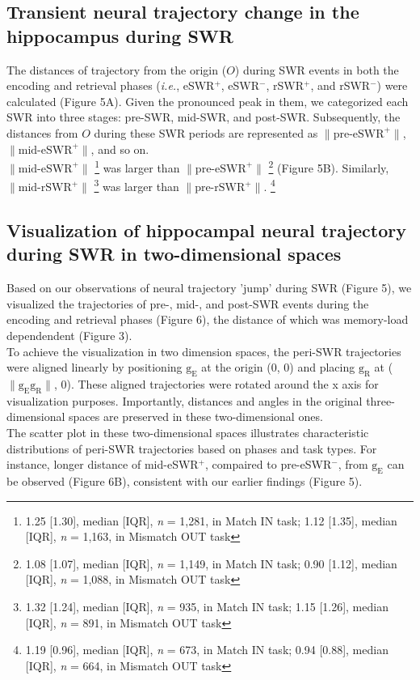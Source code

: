 \documentclass[final,3p,times,twocolumn]{elsarticle}
\begin{document}
\subsection{Transient neural trajectory change in the hippocampus during SWR}
The distances of trajectory from the origin ($O$) during SWR events in both the encoding and retrieval phases (\textit{\textit{i.e.}}, eSWR$^+$, eSWR$^-$, rSWR$^+$, and rSWR$^-$) were calculated (Figure 5A). Given the pronounced peak in them, we categorized each SWR into three stages: pre-SWR, mid-SWR, and post-SWR. Subsequently, the distances from $O$ during these SWR periods are represented as $\mathrm{\lVert \text{pre-eSWR}^+ \rVert}$, $\mathrm{\lVert \text{mid-eSWR}^+ \rVert}$, and so on.
\\
\indent
$\mathrm{\lVert \text{mid-eSWR}^+ \rVert}$
\footnote{1.25 [1.30], median [IQR], \textit{n} = 1,281, in Match IN task; 1.12 [1.35], median [IQR], \textit{n} = 1,163, in Mismatch OUT task}
was larger than $\mathrm{\lVert \text{pre-eSWR}^+ \rVert}$
\footnote{1.08 [1.07], median [IQR], \textit{n} = 1,149, in Match IN task; 0.90 [1.12], median [IQR], \textit{n} = 1,088, in Mismatch OUT task}
(Figure 5B). Similarly, $\mathrm{\lVert \text{mid-rSWR}^+ \rVert}$
\footnote{1.32 [1.24], median [IQR], \textit{n} = 935, in Match IN task; 1.15 [1.26], median [IQR], \textit{n} = 891, in Mismatch OUT task}
was larger than $\mathrm{\lVert \text{pre-rSWR}^+ \rVert}$.
\footnote{1.19 [0.96], median [IQR], \textit{n} = 673, in Match IN task; 0.94 [0.88], median [IQR], \textit{n} = 664, in Mismatch OUT task}

\subsection{Visualization of hippocampal neural trajectory during SWR in two-dimensional spaces}
Based on our observations of neural trajectory 'jump' during SWR (Figure 5), we visualized the trajectories of pre-, mid-, and post-SWR events during the encoding and retrieval phases (Figure 6), the distance of which was memory-load dependendent (Figure 3).
\\
\indent
To achieve the visualization in two dimension spaces, the peri-SWR trajectories were aligned linearly by positioning $\mathrm{g_{E}}$ at the origin (0, 0) and placing $\mathrm{g_{R}}$ at ($\mathrm{\lVert g_{E}g_{R} \rVert}$, 0). These aligned trajectories were rotated around the x axis for visualization purposes. Importantly, distances and angles in the original three-dimensional spaces are preserved in these two-dimensional ones.
\\
\indent
The scatter plot in these two-dimensional spaces illustrates characteristic distributions of peri-SWR trajectories based on phases and task types. For instance, longer distance of mid-eSWR$^+$, compaired to pre-eSWR$^-$, from $\mathrm{g_{E}}$ can be observed (Figure 6B), consistent with our earlier findings (Figure 5).
\end{document}
